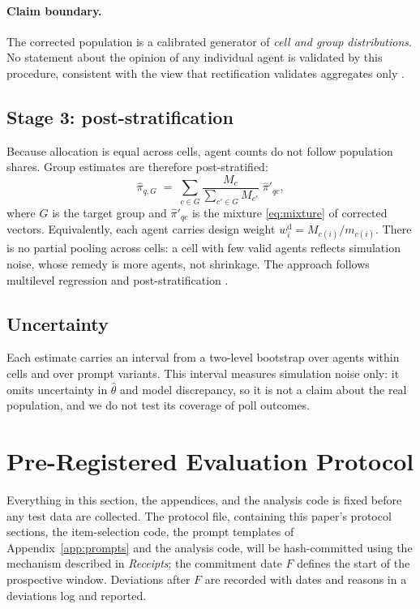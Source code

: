 \documentclass[11pt]{article}
\begin{document}
\paragraph{Claim boundary.} The corrected population is a calibrated generator of \emph{cell and group distributions}. No statement about the opinion of any individual agent is validated by this procedure, consistent with the view that rectification validates aggregates only \citep{krsteski2025valid}.

\subsection{Stage 3: post-stratification}
Because allocation is equal across cells, agent counts do not follow population shares. Group estimates are therefore post-stratified:
\begin{equation}
\hat\pi_{q,G} \;=\; \sum_{c\in G} \frac{M_c}{\sum_{c'\in G} M_{c'}}\;\hat\pi'_{qc},
\end{equation}
where $G$ is the target group and $\hat\pi'_{qc}$ is the mixture \eqref{eq:mixture} of corrected vectors. Equivalently, each agent carries design weight $w^{\text{d}}_i = M_{c(i)}/m_{c(i)}$. There is no partial pooling across cells: a cell with few valid agents reflects simulation noise, whose remedy is more agents, not shrinkage. The approach follows multilevel regression and post-stratification \citep{gelman1997poststrat,park2004mrp,wang2015xbox}.

\subsection{Uncertainty}
Each estimate carries an interval from a two-level bootstrap over agents within cells and over prompt variants. This interval measures simulation noise only: it omits uncertainty in $\hat\theta$ and model discrepancy, so it is not a claim about the real population, and we do not test its coverage of poll outcomes.

\section{Pre-Registered Evaluation Protocol}
\label{sec:protocol}

Everything in this section, the appendices, and the analysis code is fixed before any test data are collected. The protocol file, containing this paper's protocol sections, the item-selection code, the prompt templates of Appendix~\ref{app:prompts} and the analysis code, will be hash-committed using the mechanism described in \emph{Receipts}; the commitment date $F$ defines the start of the prospective window. Deviations after $F$ are recorded with dates and reasons in a deviations log and reported.
\end{document}
